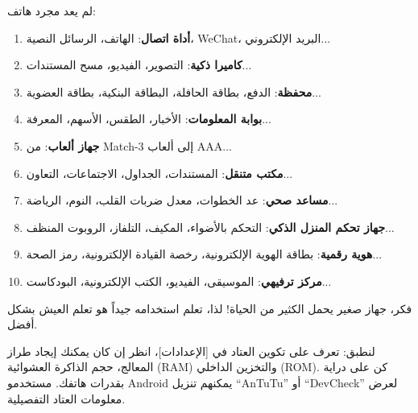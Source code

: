 
لم يعد مجرد هاتف:

\begin{enumerate}
  \item \textbf{أداة اتصال}: الهاتف، الرسائل النصية، WeChat، البريد الإلكتروني...
  \item \textbf{كاميرا ذكية}: التصوير، الفيديو، مسح المستندات...
  \item \textbf{محفظة}: الدفع، بطاقة الحافلة، البطاقة البنكية، بطاقة العضوية...
  \item \textbf{بوابة المعلومات}: الأخبار، الطقس، الأسهم، المعرفة...
  \item \textbf{جهاز ألعاب}: من Match-3 إلى ألعاب AAA...
  \item \textbf{مكتب متنقل}: المستندات، الجداول، الاجتماعات، التعاون...
  \item \textbf{مساعد صحي}: عد الخطوات، معدل ضربات القلب، النوم، الرياضة...
  \item \textbf{جهاز تحكم المنزل الذكي}: التحكم بالأضواء، المكيف، التلفاز، الروبوت المنظف...
  \item \textbf{هوية رقمية}: بطاقة الهوية الإلكترونية، رخصة القيادة الإلكترونية، رمز الصحة...
  \item \textbf{مركز ترفيهي}: الموسيقى، الفيديو، الكتب الإلكترونية، البودكاست...
\end{enumerate}

فكر، جهاز صغير يحمل الكثير من الحياة! لذا، تعلم استخدامه جيداً هو تعلم العيش بشكل أفضل.

\begin{tcbpractice}{لنطبق: تعرف على تكوين العتاد}
في [الإعدادات]، انظر إن كان يمكنك إيجاد طراز المعالج، حجم الذاكرة العشوائية (RAM) والتخزين الداخلي (ROM). كن على دراية بقدرات هاتفك. مستخدمو Android يمكنهم تنزيل “AnTuTu” أو “DevCheck” لعرض معلومات العتاد التفصيلية.

\end{tcbpractice}

